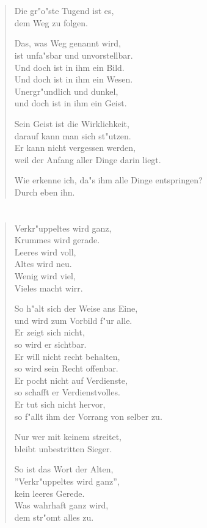 \documentclass[a4paper,10pt,openany]{book}
\begin{document}
\chapter{}
\begin{verse}
    Die gr"o"ste Tugend ist es,\\
    dem Weg zu folgen.

    Das, was Weg genannt wird,\\
    ist unfa"sbar und unvorstellbar.\\
    Und doch ist in ihm ein Bild.\\
    Und doch ist in ihm ein Wesen.\\
    Unergr"undlich und dunkel,\\
    und doch ist in ihm ein Geist.

    Sein Geist ist die Wirklichkeit,\\
    darauf kann man sich st"utzen.\\
    Er kann nicht vergessen werden,\\
    weil der Anfang aller Dinge darin liegt.

    Wie erkenne ich, da"s ihm alle Dinge entspringen?\\
    Durch eben ihn.
\end{verse}

\chapter{}
\begin{verse}
    Verkr"uppeltes wird ganz,\\
    Krummes wird gerade.\\
    Leeres wird voll,\\
    Altes wird neu.\\
    Wenig wird viel,\\
    Vieles macht wirr.

    So h"alt sich der Weise ans Eine,\\
    und wird zum Vorbild f"ur alle.\\
    Er zeigt sich nicht,\\
    so wird er sichtbar.\\
    Er will nicht recht behalten,\\
    so wird sein Recht offenbar.\\
    Er pocht nicht auf Verdienste,\\
    so schafft er Verdienstvolles.\\
    Er tut sich nicht hervor,\\
    so f"allt ihm der Vorrang von selber zu.

    Nur wer mit keinem streitet,\\
    bleibt unbestritten Sieger.

    So ist das Wort der Alten,\\
    ''Verkr"uppeltes wird ganz'',\\
    kein leeres Gerede.\\
    Was wahrhaft ganz wird,\\
    dem str"omt alles zu.
\end{verse}
\end{document}

